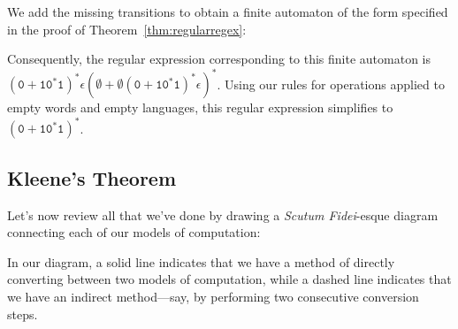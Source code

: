 \begin{example}
\begin{center}
\end{center}

We add the missing transitions to obtain a finite automaton of the form specified in the proof of Theorem~\ref{thm:regularregex}:
\begin{center}
\end{center}
Consequently, the regular expression corresponding to this finite automaton is $(\texttt{0} + \texttt{10}^{*}\texttt{1})^{*}\epsilon(\emptyset + \emptyset(\texttt{0} + \texttt{10}^{*}\texttt{1})^{*}\epsilon)^{*}$. Using our rules for operations applied to empty words and empty languages, this regular expression simplifies to $(\texttt{0} + \texttt{10}^{*}\texttt{1})^{*}$.
\end{example}

\subsection{Kleene's Theorem}

Let's now review all that we've done by drawing a \textit{Scutum Fidei}-esque diagram connecting each of our models of computation:
\begin{center}
\end{center}
In our diagram, a solid line indicates that we have a method of directly converting between two models of computation, while a dashed line indicates that we have an indirect method---say, by performing two consecutive conversion steps.

